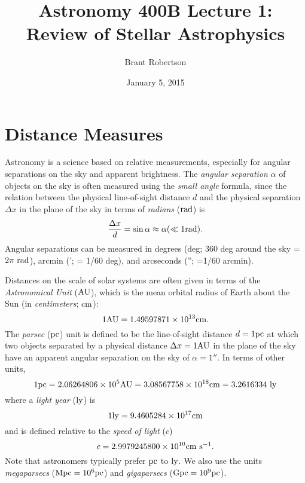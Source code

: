 \documentclass[]{article}
\title{Astronomy 400B Lecture 1: Review of Stellar Astrophysics}
\author{Brant Robertson}
\date{January 5, 2015}
\begin{document}
\maketitle

\section{Distance Measures}

Astronomy is a science based on relative measurements, 
especially for angular separations on the sky and apparent brightness.
The {\it angular separation} $\alpha$ of objects on the sky
is often measured
using the {\it small angle} formula, since the relation between
the physical line-of-sight distance $d$ and the physical separation 
$\Delta x$ in the plane of the sky in terms of {\it radians} ($\mathrm{rad}$) is
\begin{equation}
\label{eqn:small_angle}
\frac{\Delta x}{d} = \sin \alpha \approx \alpha (\ll 1 \mathrm{rad}).
\end{equation}
Angular separations can be measured in degrees (deg; 360 deg around the sky = $2\pi~\mathrm{rad}$), 
arcmin ('; = 1/60 deg),
and arcseconds (''; =1/60 arcmin).

Distances on the scale of solar systems are often given in terms
of the {\it Astronomical Unit} ($\mathrm{AU}$), which is the mean orbital
radius of Earth about the Sun (in {\it centimeters}; $\mathrm{cm}$):
\begin{equation}
\label{eqn:AU}
1 \mathrm{AU} = 1.49597871 \times 10^{13} \mathrm{cm}.
\end{equation}
\noindent
The {\it parsec} ($\mathrm{pc}$) unit is defined to be the line-of-sight distance $d=1 \mathrm{pc}$
at which two objects separated by a physical distance $\Delta x=1\mathrm{AU}$ in the
plane of the sky have an apparent angular separation on the sky of $\alpha=1''$.
In terms of other units,
\begin{equation}
\label{eqn:parsec}
1\mathrm{pc} = 2.06264806 \times 10^{5} \mathrm{AU} = 3.08567758 \times 10^{18} \mathrm{cm} = 3.2616334~\mathrm{ly}
\end{equation}
\noindent
where a {\it light year} ($\mathrm{ly}$) is
\begin{equation}
1\mathrm{ly} = 9.4605284\times10^{17}\mathrm{cm}
\end{equation}
\noindent
and is defined relative to the {\it speed of light} ($c$)
\begin{equation}
\label{eqn:speed_of_light}
c = 2.9979245800\times10^{10} \mathrm{cm}~\mathrm{s}^{-1}.
\end{equation}
\noindent
Note that astronomers typically prefer $\mathrm{pc}$ to $\mathrm{ly}$. We also
use the units {\it megaparsecs} ($\mathrm{Mpc} = 10^6 \mathrm{pc}$) and {\it gigaparsecs}
($\mathrm{Gpc} = 10^9 \mathrm{pc}$).
\end{document}
